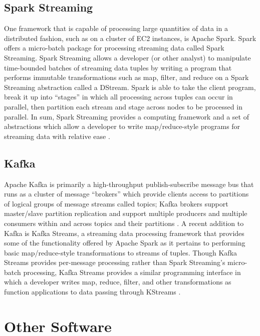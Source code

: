 \documentclass{thesis}
\begin{document}
    \subsection{Spark Streaming}
        One framework that is capable of processing large quantities of data in a distributed fashion,
        such as on a cluster of EC2 instances, is Apache Spark. Spark offers a micro-batch package for
        processing streaming data called Spark Streaming. Spark Streaming allows a developer (or other
        analyst) to manipulate time-bounded batches of streaming data tuples by writing a program that
        performs immutable transformations such as map, filter, and reduce on a Spark Streaming abstraction
        called a DStream. Spark is able to take the client program, break it up into ``stages'' in which
        all processing across tuples can occur in parallel, then partition each stream and stage
        across nodes to be processed in parallel. %
        In sum, Spark Streaming provides a computing framework and a set of abstractions which allow
        a developer to write map/reduce-style programs for streaming data with relative ease
        \cite{spark:streaming}.
    \subsection{Kafka}
        Apache Kafka is primarily a high-throughput publish-subscribe message bus that runs as a cluster
        of message ``brokers'' which provide clients access to partitions of logical groups of message streams
        called topics; Kafka brokers support master/slave partition replication and support multiple
        producers and multiple consumers within and across topics and their partitions \cite{kafka}.
        A recent addition to Kafka is Kafka Streams, a streaming data processing framework that
        provides some of the functionality offered by Apache Spark as it pertains to performing basic
        map/reduce-style transformations to streams of tuples. Though Kafka Streams provides per-message
        processing rather than Spark Streaming's micro-batch processing, Kafka Streams provides a similar
        programming interface in which a developer writes map, reduce, filter, and other
        transformations as function applications to data passing through KStreams \cite{kafka:streams}.
    \section{Other Software}
\end{document}
